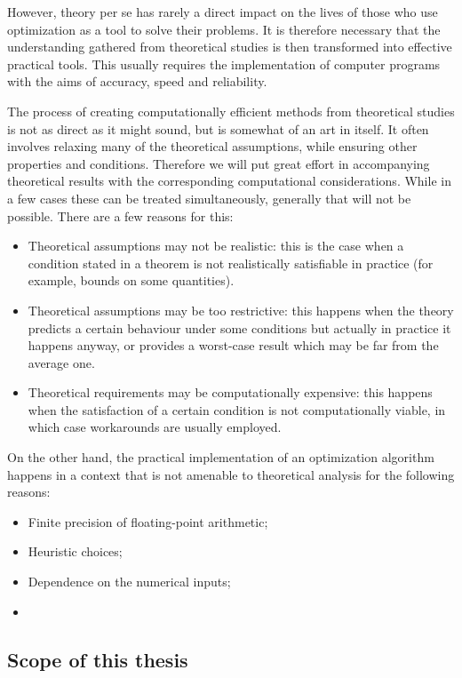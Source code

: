 However, theory per se has rarely a direct impact on the lives 
of those who use optimization as a tool to solve their problems.
It is therefore necessary that the understanding gathered from
theoretical studies is then transformed into effective practical
tools. This usually requires the implementation of computer programs
with the aims of accuracy, speed and reliability.

The process of creating computationally efficient methods from
theoretical studies is not as direct as it might sound, but is somewhat
of an art in itself. It often involves relaxing many of the theoretical 
assumptions, while ensuring other properties and conditions.
Therefore we will put great effort in accompanying theoretical
results with the corresponding computational considerations. While
in a few cases these can be treated simultaneously, generally that
will not be possible. There are a few reasons for this:
\begin{itemize}
\item Theoretical assumptions may not be realistic: this is the case
when a condition stated in a theorem is not realistically satisfiable 
in practice (for example, bounds on some quantities). 
\item Theoretical assumptions may be too restrictive: this happens
when the theory predicts a certain behaviour under some conditions
but actually in practice it happens anyway, or provides a worst-case 
result which may be far from the average one.
\item Theoretical requirements may be computationally expensive: this 
happens when the satisfaction of a certain condition is not 
computationally viable, in which case workarounds are usually employed.
\end{itemize}

On the other hand, the practical implementation of an optimization
algorithm happens in a context that is not amenable to theoretical 
analysis for the following reasons:
\begin{itemize}
\item Finite precision of floating-point arithmetic;
\item Heuristic choices;
\item Dependence on the numerical inputs;
\item 
\end{itemize}

%
%
\subsection{Scope of this thesis}

